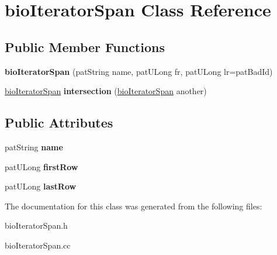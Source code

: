 \hypertarget{classbio_iterator_span}{}\section{bio\+Iterator\+Span Class Reference}
\label{classbio_iterator_span}
\subsection*{Public Member Functions}
\begin{DoxyCompactItemize}
\item 
\mbox{\label{classbio_iterator_span_ad3ea8e231711e52eb398173b0e9e09d2}} 
{\bfseries bio\+Iterator\+Span} (pat\+String name, pat\+U\+Long fr, pat\+U\+Long lr=pat\+Bad\+Id)
\item 
\mbox{\label{classbio_iterator_span_a3c56528a6287e865b24b6e55149f8f5c}} 
\hyperlink{classbio_iterator_span}{bio\+Iterator\+Span} {\bfseries intersection} (\hyperlink{classbio_iterator_span}{bio\+Iterator\+Span} another)
\end{DoxyCompactItemize}
\subsection*{Public Attributes}
\begin{DoxyCompactItemize}
\item 
\mbox{\label{classbio_iterator_span_a095805d92f6cba721945262b4c0b085c}} 
pat\+String {\bfseries name}
\item 
\mbox{\label{classbio_iterator_span_a78f69dd384ce5d95f77d0b6c178d60d8}} 
pat\+U\+Long {\bfseries first\+Row}
\item 
\mbox{\label{classbio_iterator_span_aa7b0d87364cabcd3555b1805d27b8325}} 
pat\+U\+Long {\bfseries last\+Row}
\end{DoxyCompactItemize}


The documentation for this class was generated from the following files\+:\begin{DoxyCompactItemize}
\item 
bio\+Iterator\+Span.\+h\item 
bio\+Iterator\+Span.\+cc\end{DoxyCompactItemize}
